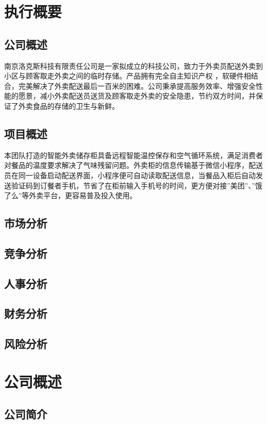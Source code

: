 \documentclass[violet]{main}
\begin{document}
	\maketitle
	\makeflypage
	\frontmatter
	\tableofcontents
	\mainmatter
	\Fancy
	\chapter{执行概要}
		\section{公司概述}
			南京洛克斯科技有限责任公司是一家拟成立的科技公司，致力于外卖员配送外卖到小区与顾客取走外卖之间的临时存储。产品拥有完全自主知识产权 ，软硬件相结合，完美解决了外卖配送最后一百米的困难。公司秉承提高服务效率、增强安全性能的愿景，减小外卖配送员送货及顾客取走外卖的安全隐患，节约双方时间，并保证了外卖食品的存储的卫生与新鲜。
		\section{项目概述}
			本团队打造的智能外卖储存柜具备远程智能温控保存和空气循环系统，满足消费者对餐品的温度要求解决了气味残留问题。外卖柜的信息传输基于微信小程序，配送员在同一设备启动配送界面，小程序便可自动读取配送信息，当餐品入柜后自动发送验证码到订餐者手机，节省了在柜前输入手机号的时间，更方便对接''美团''、''饿了么''等外卖平台，更容易普及投入使用。
		\section{市场分析}
		\section{竞争分析}
		\section{人事分析}
		\section{财务分析}
		\section{风险分析}
	\chapter{公司概述}
		\section{公司简介}
\end{document}
